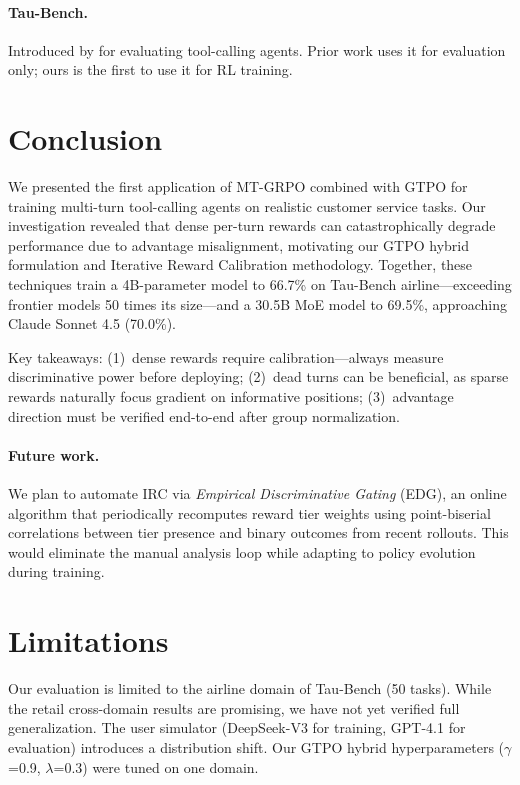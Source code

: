 \documentclass[11pt]{article}
\newcommand{\irc}{\textsc{IRC}}
\begin{document}
\paragraph{Tau-Bench.} Introduced by \citet{yao2024taubench} for evaluating tool-calling agents. Prior work uses it for evaluation only; ours is the first to use it for RL training.

\section{Conclusion}
\label{sec:conclusion}

We presented the first application of MT-GRPO combined with GTPO for training multi-turn tool-calling agents on realistic customer service tasks. Our investigation revealed that dense per-turn rewards can catastrophically degrade performance due to advantage misalignment, motivating our GTPO hybrid formulation and Iterative Reward Calibration methodology. Together, these techniques train a 4B-parameter model to 66.7\% on Tau-Bench airline---exceeding frontier models 50 times its size---and a 30.5B MoE model to 69.5\%, approaching Claude Sonnet 4.5 (70.0\%).

Key takeaways: (1)~dense rewards require calibration---always measure discriminative power before deploying; (2)~dead turns can be beneficial, as sparse rewards naturally focus gradient on informative positions; (3)~advantage direction must be verified end-to-end after group normalization.

\paragraph{Future work.} We plan to automate \irc{} via \emph{Empirical Discriminative Gating} (EDG), an online algorithm that periodically recomputes reward tier weights using point-biserial correlations between tier presence and binary outcomes from recent rollouts. This would eliminate the manual analysis loop while adapting to policy evolution during training.

\section*{Limitations}

Our evaluation is limited to the airline domain of Tau-Bench (50 tasks). While the retail cross-domain results are promising, we have not yet verified full generalization. The user simulator (DeepSeek-V3 for training, GPT-4.1 for evaluation) introduces a distribution shift. Our GTPO hybrid hyperparameters ($\gamma$=0.9, $\lambda$=0.3) were tuned on one domain.
\end{document}

